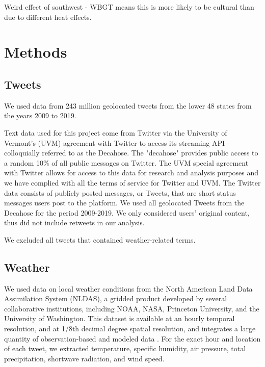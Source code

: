 \documentclass{article}
\begin{document}
Weird effect of southwest - WBGT means this is more likely to be cultural than due to different heat effects.


\section{Methods}
\subsection{Tweets}
We used data from 243 million geolocated tweets from the lower 48 states from the years 2009 to 2019.  

Text data used for this project come from Twitter via the University of Vermont’s (UVM) agreement with Twitter to access its streaming API - colloquially referred to as the Decahose. The "decahose" provides public access to a random 10\% of all public messages on Twitter. The UVM special agreement with Twitter allows for access to this data for research and analysis purposes and we have complied with all the terms of service for Twitter and UVM. 
The Twitter data consists of publicly posted messages, or Tweets, that are short status messages users post to the platform. We used all geolocated Tweets from the Decahose for the period 2009-2019. We only considered users’ original content, thus did not include retweets in our analysis.

We excluded all tweets that contained weather-related terms.

\subsection{Weather}
We used data on local weather conditions from the North American Land Data Assimilation System (NLDAS), a gridded product developed by several collaborative institutions, including NOAA, NASA, Princeton University, and the University of Washington.  This dataset is available at an hourly temporal resolution, and at 1/8th decimal degree spatial resolution, and integrates a large quantity of observation-based and modeled data  \cite{xia_continental-scale_2012}.  For the exact hour and location of each tweet, we extracted temperature, specific humidity, air pressure, total precipitation, shortwave radiation, and wind speed.  
\end{document}
